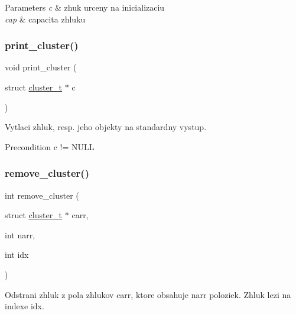 \begin{DoxyParams}{Parameters}
{\em c} & zhuk urceny na inicializaciu \\
\hline
{\em cap} & capacita zhluku \\
\hline
\end{DoxyParams}
\mbox{\label{group__clust_ga322bfd43ab7a3fa830cd69e79b7eef06}} 
\subsubsection{\texorpdfstring{print\+\_\+cluster()}{print\_cluster()}}
{\footnotesize\ttfamily void print\+\_\+cluster (\begin{DoxyParamCaption}\item[{struct \hyperlink{structcluster__t}{cluster\+\_\+t} $\ast$}]{c }\end{DoxyParamCaption})}

Vytlaci zhluk, resp. jeho objekty na standardny vystup.

\begin{DoxyPrecond}{Precondition}
c != N\+U\+LL 
\end{DoxyPrecond}
\mbox{\label{group__clust_gaf73744f9128e4605127b40932a730a48}} 
\subsubsection{\texorpdfstring{remove\+\_\+cluster()}{remove\_cluster()}}
{\footnotesize\ttfamily int remove\+\_\+cluster (\begin{DoxyParamCaption}\item[{struct \hyperlink{structcluster__t}{cluster\+\_\+t} $\ast$}]{carr,  }\item[{int}]{narr,  }\item[{int}]{idx }\end{DoxyParamCaption})}

Odstrani zhluk z pola zhlukov \textquotesingle{}carr\textquotesingle{}, ktore obsahuje \textquotesingle{}narr\textquotesingle{} poloziek. Zhluk lezi na indexe \textquotesingle{}idx\textquotesingle{}.

